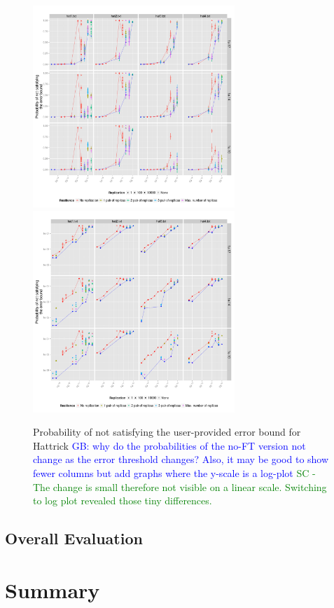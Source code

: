\documentclass{sig-alternate}
\newcommand{\sui}[1]{%
  \textcolor{green}{SC - #1}
}
\newcommand{\greg}[1]{%
  \textcolor{blue}{GB: #1}
}
\begin{document}
\begin{figure}[ht!]
\centering
\includegraphics[height=3in]{figs/Hattrick_ImperfectRate.png}
\includegraphics[height=3in]{figs/Hattrick_ImperfectRate_log.png}
\caption{Probability of not satisfying the user-provided error bound for Hattrick \greg{why do the probabilities of the no-FT version not change as the error threshold changes? Also, it may be good to show fewer columns but add graphs where the y-scale is a log-plot} \sui{The change is small therefore not visible on a linear scale. Switching to log plot revealed those tiny differences.}}
\label{fig:Hattrick_ImperfectRate}
\end{figure}

\subsection{Overall Evaluation}
\label{sec:eval:overall}


\section{Summary}
\label{sec:summary}



\end{document}
